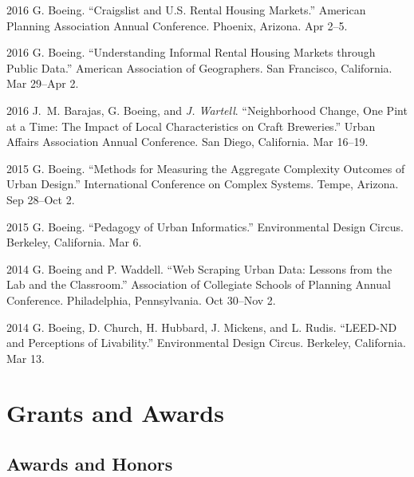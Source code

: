 \documentclass[11pt,letterpaper]{report}
\begin{document}
\begin{tablist}
        \item[2016] \tab{}G. Boeing. \enquote{Craigslist and U.S. Rental Housing Markets.} American Planning Association Annual Conference. Phoenix, Arizona. Apr 2--5.

        \item[2016] \tab{}G. Boeing. \enquote{Understanding Informal Rental Housing Markets through Public Data.} American Association of Geographers. San Francisco, California. Mar 29--Apr 2.

        \item[2016] \tab{}J.~M. Barajas, G. Boeing, and \textit{J. Wartell}. \enquote{Neighborhood Change, One Pint at a Time: The Impact of Local Characteristics on Craft Breweries.} Urban Affairs Association Annual Conference. San Diego, California. Mar 16--19.

        \item[2015] \tab{}G. Boeing. \enquote{Methods for Measuring the Aggregate Complexity Outcomes of Urban Design.} International Conference on Complex Systems. Tempe, Arizona. Sep 28--Oct 2.

        \item[2015] \tab{}G. Boeing. \enquote{Pedagogy of Urban Informatics.} Environmental Design Circus. Berkeley, California. Mar 6.

        \item[2014] \tab{}G. Boeing and P. Waddell. \enquote{Web Scraping Urban Data: Lessons from the Lab and the Classroom.} Association of Collegiate Schools of Planning Annual Conference. Philadelphia, Pennsylvania. Oct 30--Nov 2.

        \item[2014] \tab{}G. Boeing, D. Church, H. Hubbard, J. Mickens, and L. Rudis. \enquote{LEED-ND and Perceptions of Livability.} Environmental Design Circus. Berkeley, California. Mar 13.

    \end{tablist}



    \section*{Grants and Awards}

    \subsection*{Awards and Honors}
\end{document}
